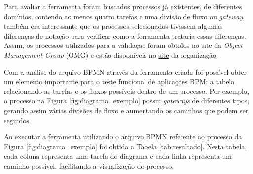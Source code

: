 \documentclass[12pt]{article}
\begin{document}
Para avaliar a ferramenta foram buscados processos já existentes, de diferentes domínios, contendo ao menos quatro tarefas e uma divisão de fluxo ou \emph{gateway}, também era interessante que os processos selecionados tivessem algumas diferenças de notação para verificar como a ferramenta trataria essas diferenças. Assim, os processos utilizados para a validação foram obtidos no site da \emph{Object Management Group} (OMG) e estão disponíveis no \href{http://www.omg.org/spec/BPMN/20100602/2010-06-03/}{site} da organização.


Com a análise do arquivo BPMN através da ferramenta criada foi possível obter um elemento importante para o teste funcional de aplicações BPM: a tabela relacionando as tarefas e os fluxos possíveis dentro de um processo. Por exemplo, o processo na Figura \ref{fig:diagrama_exemplo} possui \emph{gateways} de diferentes tipos, gerando assim várias divisões de fluxo e aumentando os caminhos que podem ser seguidos. 

Ao executar a ferramenta utilizando o arquivo BPMN referente ao processo da Figura  \ref{fig:diagrama_exemplo} foi obtida a Tabela \ref{tab:resultado}. Nesta tabela, cada coluna representa uma tarefa do diagrama e cada linha representa um caminho possível, facilitando a visualização do processo. 

\begin{table}[]
\centering
\caption{Tabela obtida através do arquivo BPMN}
\label{tab:resultado}
\end{table}
\end{document}
